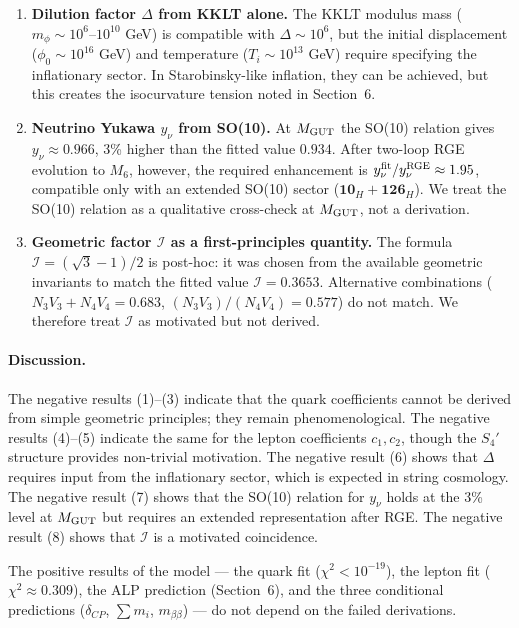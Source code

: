 \documentclass[12pt,a4paper]{article}
\numberwithin{equation}{section}
\begin{document}
\begin{enumerate}[leftmargin=1.5em]
\item \textbf{Dilution factor \(\Delta\) from KKLT alone.}
The KKLT modulus mass (\(m_\phi \sim 10^6\)--\(10^{10}\) GeV)
is compatible with \(\Delta \sim 10^6\), but the initial
displacement (\(\phi_0 \sim 10^{16}\) GeV) and temperature
(\(T_i \sim 10^{13}\) GeV) require specifying the inflationary
sector. In Starobinsky-like inflation, they can be achieved,
but this creates the isocurvature tension noted in Section~6.

\item \textbf{Neutrino Yukawa \(y_\nu\) from SO(10).}
At \(M_{\rm GUT}\) the SO(10) relation gives \(y_\nu \approx 0.966\),
3\% higher than the fitted value \(0.934\). After two-loop RGE
evolution to \(M_6\), however, the required enhancement is
\(y_\nu^{\rm fit}/y_\nu^{\rm RGE} \approx 1.95\), compatible only
with an extended SO(10) sector (\(\mathbf{10}_H + \mathbf{126}_H\)).
We treat the SO(10) relation as a qualitative cross-check at
\(M_{\rm GUT}\), not a derivation.

\item \textbf{Geometric factor \(\mathcal{I}\) as a first-principles quantity.}
The formula \(\mathcal{I} = (\sqrt{3}-1)/2\) is post-hoc: it was
chosen from the available geometric invariants to match the
fitted value \(\mathcal{I} = 0.3653\). Alternative combinations
(\(N_3 V_3 + N_4 V_4 = 0.683\), \((N_3 V_3)/(N_4 V_4) = 0.577\))
do not match. We therefore treat \(\mathcal{I}\) as motivated
but not derived.
\end{enumerate}

\paragraph{Discussion.}
The negative results (1)--(3) indicate that the quark coefficients
cannot be derived from simple geometric principles; they remain
phenomenological. The negative results (4)--(5) indicate the same
for the lepton coefficients \(c_1, c_2\), though the \(S_4'\) structure
provides non-trivial motivation. The negative result (6) shows that
\(\Delta\) requires input from the inflationary sector, which is
expected in string cosmology. The negative result (7) shows that
the SO(10) relation for \(y_\nu\) holds at the 3\% level at
\(M_{\rm GUT}\) but requires an extended representation after RGE.
The negative result (8) shows that \(\mathcal{I}\) is a motivated
coincidence.

The positive results of the model --- the quark fit
(\(\chi^2 < 10^{-19}\)), the lepton fit (\(\chi^2 \approx 0.309\)),
the ALP prediction (Section~6), and the three conditional
predictions (\(\delta_{CP}\), \(\sum m_i\), \(m_{\beta\beta}\)) ---
do not depend on the failed derivations.
\end{document}

